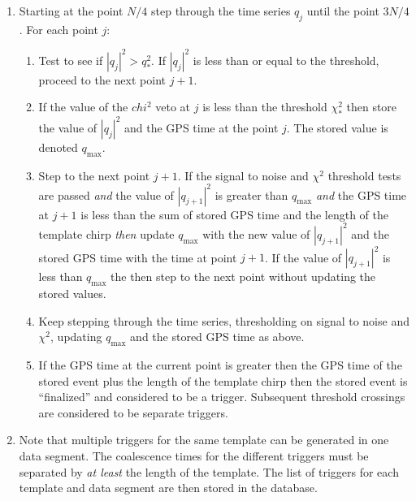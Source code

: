 \begin{enumerate}
\item Starting at the point $N/4$ step through the time series $q_j$ until the
point $3N/4$. For each point $j$: 
\begin{enumerate}
\item Test to see if $|q_j|^2 > q^2_\ast$. If $|q_j|^2$ is less than or equal
to the threshold, proceed to the next point $j+1$.

\item If the value of the $chi^2$ veto at $j$ is less than the threshold
$\chi^2_\ast$ then store the value of $|q_j|^2$ and the GPS time at the point
$j$.  The stored value is denoted $q_{\mathrm{max}}$.

\item Step to the next point $j+1$. If the signal to noise and $\chi^2$
threshold tests are passed \textit{and} the value of $|q_{j+1}|^2$ is
greater than $q_{\mathrm{max}}$ \textit{and} the GPS time at $j+1$ is less
than the sum of stored GPS time and the length of the template chirp
\textit{then} update $q_{\mathrm{max}}$ with the new value of $|q_{j+1}|^2$
and the stored GPS time with the time at point $j+1$.  If the value of
$|q_{j+1}|^2$ is less than $q_{\mathrm{max}}$ the then step to the next point
without updating the stored values. 

\item Keep stepping through the time series, thresholding on signal to noise
and $\chi^2$, updating $q_{\mathrm{max}}$ and the stored GPS time as above.

\item If the GPS time at the current point is greater then the GPS time of the
stored event plus the length of the template chirp then the stored event is
``finalized'' and considered to be a trigger. Subsequent threshold crossings are
considered to be separate triggers.
\end{enumerate}

\item Note that multiple triggers for the same template can be generated in
one data segment. The coalescence times for the different triggers must be
separated by \textit{at least} the length of the template.  The list of
triggers for each template and data segment are then stored in the database. 
\end{enumerate}

